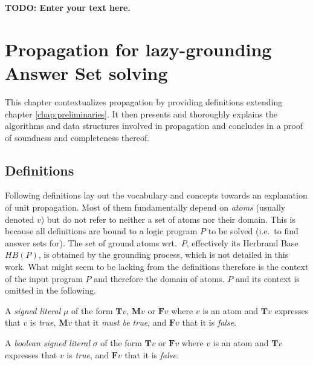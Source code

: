 \documentclass{vutinfth} %
\newcommand{\todo}[1]{{\color{red}\textbf{TODO: {#1}}}} %
\theoremstyle{example}
\theoremstyle{definition}
\newtheorem{definition}{Definition}[section]
\theoremstyle{theorem}
\theoremstyle{lemma}
\theoremstyle{corollary}
\newcommand{\sgl}{\mu}
\newcommand{\bsgl}{\sigma}
\begin{document}
\todo{Enter your text here.}

\chapter{Propagation for lazy-grounding Answer Set solving}

This chapter contextualizes propagation by providing definitions extending chapter \ref{chap:preliminaries}. It then presents and thoroughly explains the algorithms and data structures involved in propagation and concludes in a proof of soundness and completeness thereof.

\section{Definitions}


Following definitions lay out the vocabulary and concepts towards an explanation of unit propagation. Most of them fundamentally depend on \emph{atoms} (usually denoted $v$) but do not refer to neither a set of atoms nor their domain. This is because all definitions are bound to a logic program $P$ to be solved (i.e.~to find answer sets for). The set of ground atoms wrt.~$P$, effectively its Herbrand Base $\textit{HB}(P)$, is obtained by the grounding process, which is not detailed in this work. What might seem to be lacking from the definitions therefore is the context of the input program $P$ and therefore the domain of atoms. $P$ and its context is omitted in the following.


A \emph{signed literal} $\sgl$ of the form $\mathbf{T}v$, $\mathbf{M}v$ or $\mathbf{F}v$ where $v$ is an atom and $\mathbf{T}v$ expresses that $v$ is \emph{true}, $\mathbf{M}v$ that it \emph{must be true}, and $\mathbf{F}v$ that it is \emph{false}.

A \emph{boolean signed literal} $\bsgl$ of the form $\mathbf{T}v$ or $\mathbf{F}v$ where $v$ is an atom and  $\mathbf{T}v$ expresses that $v$ is \emph{true}, and $\mathbf{F}v$ that it is \emph{false}.
\end{document}
